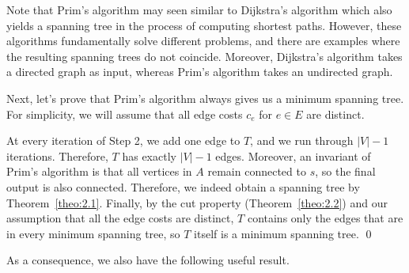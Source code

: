 \begin{center}
\end{center}
\vspace{-0.25cm}
Note that Prim's algorithm may seen similar to Dijkstra's algorithm 
which also yields a spanning tree in the process of computing shortest paths. 
However, these algorithms fundamentally solve different problems, and 
there are examples where the resulting spanning trees do not coincide. 
Moreover, Dijkstra's algorithm takes a directed graph as input, 
whereas Prim's algorithm takes an undirected graph. 

Next, let's prove that Prim's algorithm always gives us a minimum spanning tree. 
For simplicity, we will assume that all edge costs $c_e$ for 
$e \in E$ are distinct. 

\begin{pf}
    At every iteration of Step 2, we add one edge to $T$, and we run 
    through $|V| - 1$ iterations. Therefore, $T$ has exactly 
    $|V| - 1$ edges. Moreover, an invariant of Prim's algorithm is that 
    all vertices in $A$ remain connected to $s$, so the final output is 
    also connected. Therefore, we indeed obtain a spanning tree by 
    Theorem~\ref{theo:2.1}. Finally, by the cut property (Theorem~\ref{theo:2.2})
    and our assumption that all the edge costs are distinct, $T$ contains 
    only the edges that are in every minimum spanning tree, so $T$ 
    itself is a minimum spanning tree. \qed 
\end{pf}

As a consequence, we also have the following useful result. 

